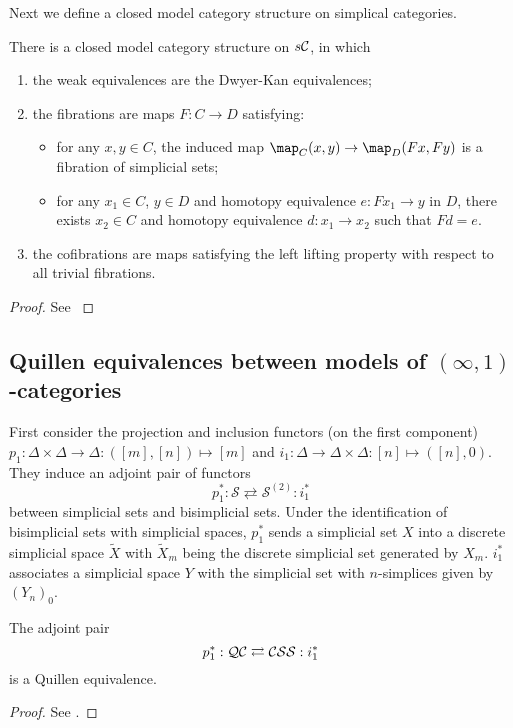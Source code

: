 Next we define a closed model category structure on simplical categories.
\begin{thm}
There is a closed model category structure on $s{\cal C}$, in which
\begin{enumerate}
\item the weak equivalences are the Dwyer-Kan equivalences;
\item the fibrations are maps $F:C\to D$ satisfying:
\begin{itemize}
\item for any $x,y\in C$, the induced map $\map_C(x,y)\to\map_D(Fx,Fy)$ is a fibration of simplicial sets;
\item for any $x_1\in C$, $y\in D$ and homotopy equivalence $e:Fx_1\to y$ in $D$, there exists $x_2\in C$ and homotopy equivalence $d:x_1\to x_2$ such that $Fd=e$.
\end{itemize}
\item the cofibrations are maps satisfying the left lifting property with respect to all trivial fibrations.
\end{enumerate}
\end{thm}

\begin{proof}
See \cite{bergner4}
\end{proof}

\subsection{Quillen equivalences between models of $(\infty,1)$-categories}

First consider the projection and inclusion functors (on the first component) $p_1:\Delta\times\Delta\to\Delta:([m],[n])\mapsto[m]$ and $i_1:\Delta\to\Delta\times\Delta:[n]\mapsto([n],0)$. They induce an adjoint pair of functors
$$p_1^*:\mathcal S\rightleftarrows\mathcal S^{(2)}:i_1^*$$
between simplicial sets and bisimplicial sets. Under the identification of bisimplicial sets with simplicial spaces, $p_1^*$ sends a simplicial set $X$ into a discrete simplicial space $\tilde X$ with $\tilde X_m$ being the discrete simplicial set generated by $X_m$. $i_1^*$ associates a simplicial space $Y$ with the simplicial set with $n$-simplices given by $(Y_n)_0$.

\begin{thm}
The adjoint pair
$$p_1^*:{\cal QC}\rightleftarrows{\cal CSS}:i_1^*$$
is a Quillen equivalence.
\end{thm}

\begin{proof}
See \cite{jt}.
\end{proof}

